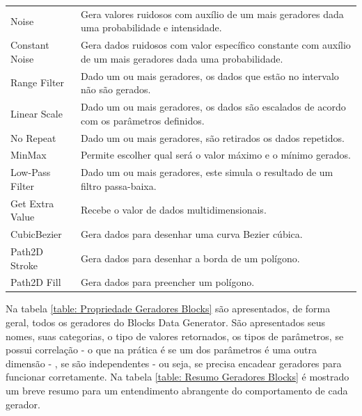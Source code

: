 \documentclass[
	12pt,				%
	openright,			%
	twoside,			%
	a4paper,			%
	english,			%
	brazil				%
	]{abntex2}
\begin{document}
\begin{table}[h]
\begin{tabular}{l|p{14cm}}
				Noise                & Gera valores ruidosos com auxílio de um mais geradores dada uma probabilidade e intensidade. \\
				Constant Noise       & Gera dados ruidosos com valor específico constante com auxílio de um mais geradores dada uma probabilidade. \\
				Range Filter         & Dado um ou mais geradores, os dados que estão no intervalo não são gerados.\\
				Linear Scale         & Dado um ou mais geradores, os dados são escalados de acordo com os parâmetros definidos. \\
				No Repeat            & Dado um ou mais geradores, são retirados os dados repetidos. \\
				MinMax               & Permite escolher qual será o valor máximo e o mínimo gerados. \\
				Low-Pass Filter      & Dado um ou mais geradores, este simula o resultado de um filtro passa-baixa.\\
				Get Extra Value      & Recebe o valor de dados multidimensionais. \\
				CubicBezier          & Gera dados para desenhar uma curva Bezier cúbica. \\
				Path2D Stroke        & Gera dados para desenhar a borda de um polígono. \\
				Path2D Fill          & Gera dados para preencher um polígono. \\
			\end{tabular}
		\end{table}
		
		Na tabela \ref{table: Propriedade Geradores Blocks} são apresentados, de forma geral, todos os geradores do Blocks Data Generator. São apresentados seus nomes, suas categorias, o tipo de valores retornados, os tipos de parâmetros, se possui correlação - o que na prática é se um dos parâmetros é uma outra dimensão - , se são independentes - ou seja, se precisa encadear geradores para funcionar corretamente.
		Na tabela \ref{table: Resumo Geradores Blocks} é mostrado um breve resumo para um entendimento abrangente do comportamento de cada gerador.

\end{document}
